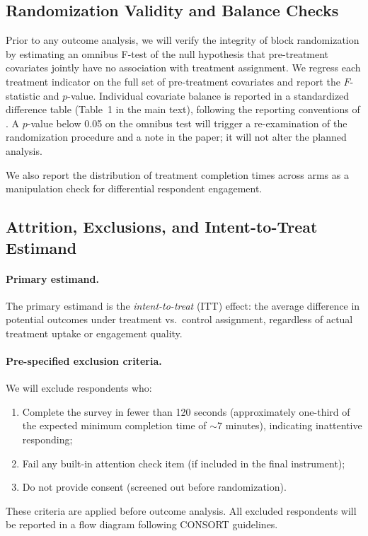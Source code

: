 \subsection{Randomization Validity and Balance Checks}

Prior to any outcome analysis, we will verify the integrity of block randomization by estimating an omnibus F-test of the null hypothesis that pre-treatment covariates jointly have no association with treatment assignment.
We regress each treatment indicator on the full set of pre-treatment covariates and report the $F$-statistic and $p$-value.
Individual covariate balance is reported in a standardized difference table (Table~1 in the main text), following the reporting conventions of \citet{Imbens2015}.
A $p$-value below 0.05 on the omnibus test will trigger a re-examination of the randomization procedure and a note in the paper; it will not alter the planned analysis.

We also report the distribution of treatment completion times across arms as a manipulation check for differential respondent engagement.

\subsection{Attrition, Exclusions, and Intent-to-Treat Estimand}

\paragraph{Primary estimand.}
The primary estimand is the \textit{intent-to-treat} (ITT) effect: the average difference in potential outcomes under treatment vs.\ control assignment, regardless of actual treatment uptake or engagement quality.

\paragraph{Pre-specified exclusion criteria.}
We will exclude respondents who:
\begin{enumerate}
    \item Complete the survey in fewer than 120 seconds (approximately one-third of the expected minimum completion time of $\sim$7 minutes), indicating inattentive responding;
    \item Fail any built-in attention check item (if included in the final instrument);
    \item Do not provide consent (screened out before randomization).
\end{enumerate}
These criteria are applied before outcome analysis.
All excluded respondents will be reported in a flow diagram following CONSORT guidelines.

